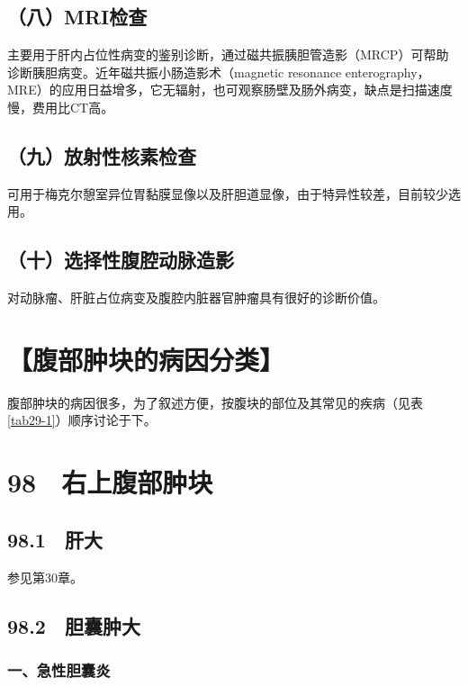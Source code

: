 \subsection{（八）MRI检查}

主要用于肝内占位性病变的鉴别诊断，通过磁共振胰胆管造影（MRCP）可帮助诊断胰胆病变。近年磁共振小肠造影术（magnetic
resonance
enterography，MRE）的应用日益增多，它无辐射，也可观察肠壁及肠外病变，缺点是扫描速度慢，费用比CT高。

\subsection{（九）放射性核素检查}

可用于梅克尔憩室异位胃黏膜显像以及肝胆道显像，由于特异性较差，目前较少选用。

\subsection{（十）选择性腹腔动脉造影}

对动脉瘤、肝脏占位病变及腹腔内脏器官肿瘤具有很好的诊断价值。

\section{【腹部肿块的病因分类】}

腹部肿块的病因很多，为了叙述方便，按腹块的部位及其常见的疾病（见表\ref{tab29-1}）顺序讨论于下。

\protect\hypertarget{text00229.html}{}{}

\section{98　右上腹部肿块}

\subsection{98.1　肝大}

参见第30章。

\subsection{98.2　胆囊肿大}

\subsubsection{一、急性胆囊炎}


